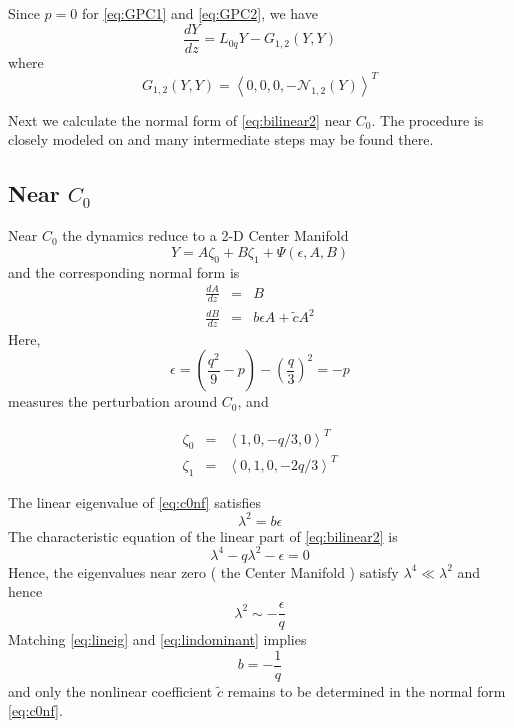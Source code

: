Since $p=0$ for \eqref{eq:GPC1} and \eqref{eq:GPC2}, we have 
\begin{equation} \label{eq:bilinear2}
 \frac{ dY }{ dz } = L_{0q} Y - G_{1,2}(Y,Y) 
\end{equation}
where 
\begin{equation}\label{eq:nonlinear}
G_{1,2}(Y,Y) = \left<0,0,0,-\mathcal{N}_{1,2}\left(Y\right)\right>^T
\end{equation}

Next we calculate the normal form of \eqref{eq:bilinear2} near $C_0$. The procedure is
closely modeled on \cite{IA} and many intermediate steps may be found there. 


\subsection{ Near $C_0$ }

Near $C_0$ the dynamics reduce to a 2-D Center Manifold
\begin{equation}\label{eq:c0cm}
 Y = A \zeta_0 + B \zeta_1 + \Psi(\epsilon,A,B)
\end{equation}
and the corresponding normal form is
\begin{subequations}
\begin{eqnarray}\label{eq:c0nf}
\frac{dA}{dz} &=& B \\
\frac{dB}{dz} &=& b \epsilon A + \tilde{c} A^2
\end{eqnarray}
\end{subequations}
Here,
\begin{equation}
\epsilon = \left( \frac{q^2}{9} - p\right) - \left(\frac{q}{3}\right)^2 = - p 
\end{equation}
measures the perturbation around $C_0$, and

\begin{subequations}
\begin{eqnarray}\label{eq:lineareigs}
\zeta_0 &=& \left<1,0,-q/3,0\right>^T\\
\zeta_1 &=& \left<0,1,0,-2 q/3\right>^T 
\end{eqnarray}
\end{subequations}

The linear eigenvalue of \eqref{eq:c0nf} satisfies 
\begin{equation}\label{eq:lineig}
\lambda^2 = b \epsilon 
\end{equation}
The characteristic equation of the linear part of 
\eqref{eq:bilinear2} is 
\begin{equation}\label{eq:charlinear}
\lambda^4 - q \lambda^2 - \epsilon =  0 
\end{equation}
Hence, the eigenvalues near zero ( the Center Manifold ) satisfy $\lambda^4 \ll \lambda^2$ and hence 
\begin{equation}\label{eq:lindominant}
\lambda^2 \sim -\frac{\epsilon}{q}
\end{equation}
Matching \eqref{eq:lineig} and \eqref{eq:lindominant} implies
\begin{equation}
b = - \frac{1}{q}
\end{equation}
and only the nonlinear coefficient $\tilde{c}$ remains to be determined in the normal form \eqref{eq:c0nf}.


